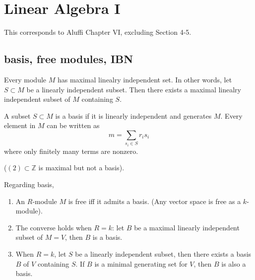 \documentclass[openany]{book}
\newcommand{\Z}{\mathbb{Z}}
\begin{document}






\chapter{Linear Algebra I}
This corresponds to Aluffi Chapter VI, excluding Section 4-5.

\section{basis, free modules, IBN}

\begin{prop}[Zorn's]
    Every module $M$ has maximal linealry independent set. In other words, let $S\subset M$ be a linearly independent subset. Then there exists a maximal linealry independent subset of $M$ containing $S$.
\end{prop}

\begin{defn}[basis]
    A subset $S\subset M$ is a basis if it is linearly independent and generates $M$. Every element in $M$ can be written as 
    \begin{equation*}
        m=\sum_{s_i\in S}r_is_i
    \end{equation*}
    where only finitely many terms are nonzero.
    
    ($(2)\subset\Z$ is maximal but not a basis).
\end{defn}


\begin{prop}
    Regarding basis, 
    \begin{enumerate}
        \item An $R$-module $M$ is free iff it admits a basis. (Any vector space is free as a $k$-module).
        \item The converse holds when $R=k$: let $B$ be a maximal linearly independent subset of $M=V$, then $B$ is a basis.
        \item When $R=k$, let $S$ be a linearly independent subset, then there exists a basis $B$ of $V$ containing $S$. If $B$ is a minimal generating set for $V$, then $B$ is also a basis.
    \end{enumerate}
\end{prop}
\end{document}
